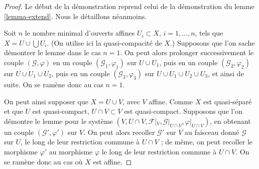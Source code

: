 \begin{proof}
Le début de la démonstration reprend celui de la démonstration du
lemme \ref{lemma-extend}. Nous le détaillons néanmoins.

\medskip\noindent
Soit $n$ le nombre minimal d'ouverts affines $U_i \subset X$,
$i = 1, \ldots , n$, tels que $X = U \cup \bigcup U_i$.
(On utilise ici la quasi-compacité de $X$.) Supposons que
l'on sache démontrer le lemme dans le cas $n = 1$. On peut alors prolonger successivement
le couple $(\mathcal{G}, \varphi)$
en un couple $(\mathcal{G}_1, \varphi_1)$ sur $U \cup U_1$,
puis en un couple $(\mathcal{G}_2, \varphi_2)$ sur $U \cup U_1 \cup U_2$,
puis en un couple $(\mathcal{G}_3, \varphi_3)$ sur $U \cup U_1 \cup U_2 \cup U_3$,
et ainsi de suite.
On se ramène donc au cas $n = 1$.

\medskip\noindent
On peut ainsi supposer que $X = U \cup V$, avec $V$ affine.
Comme $X$ est quasi-séparé et que $U$ est quasi-compact,
$U \cap V \subset V$ est quasi-compact.
Supposons que l'on démontre le lemme pour le système
$(V, U \cap V, \mathcal{F}|_V, \mathcal{G}|_{U \cap V}, \varphi|_{U \cap V})$,
en obtenant un couple $(\mathcal{G}', \varphi')$ sur $V$.
On peut alors recoller $\mathcal{G}'$ sur $V$ au faisceau donné $\mathcal{G}$
sur $U$, le long de leur restriction commune à $U \cap V$ ; de même, on peut recoller
le morphisme $\varphi'$ au morphisme $\varphi$ le long de leur restriction commune à
$U \cap V$. On se ramène donc au cas où $X$ est affine.


\end{proof}

